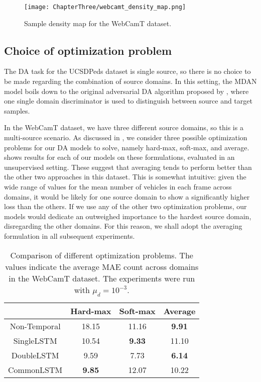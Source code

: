 \begin{figure}[!ht]
	\centering
	\texttt{[image: ChapterThree/webcamt\_density\_map.png]}   
	\caption{Sample density map for the WebCamT dataset.}
	\label{fig:webcamt_density_map}
\end{figure}

\subsection{Choice of optimization problem}

The DA task for the UCSDPeds dataset is single source, so there is no choice to be made regarding the combination of source domains. In this setting, the MDAN model boils down to the original adversarial DA algorithm proposed by \citet{Ganin2015}, where one single domain discriminator is used to distinguish between source and target samples.

In the WebCamT dataset, we have three different source domains, so this is a multi-source scenario. As discussed in , we consider three possible optimization problems for our DA models to solve, namely hard-max, soft-max, and average.  shows results for each of our models on these formulations, evaluated in an unsupervised setting. These suggest that averaging tends to perform better than the other two approaches in this dataset. This is somewhat intuitive: given the wide range of values for the mean number of vehicles in each frame across domains, it would be likely for one source domain to show a significantly higher loss than the others. If we use any of the other two optimization problems, our models would dedicate an outweighed importance to the hardest source domain, disregarding the other domains. For this reason, we shall adopt the averaging formulation in all subsequent experiments.

\begin{table}[!ht]
	\centering
	\begin{tabular}{ c | c  c  c }
		 & Hard-max & Soft-max & Average\\
		\hline
		Non-Temporal & 18.15 & 11.16 & \textbf{9.91}  \\
		SingleLSTM & 10.54 & \textbf{9.33} & 11.10  \\
		DoubleLSTM & 9.59 & 7.73 & \textbf{6.14} \\
		CommonLSTM & \textbf{9.85} & 12.07 & 10.22 \\
	\end{tabular}
	\caption{Comparison of different optimization problems. The values indicate the average MAE count across domains in the WebCamT dataset. The experiments were run with $\mu_d=10^{-3}$. }
	\label{table:optimization_experiments}
\end{table}

